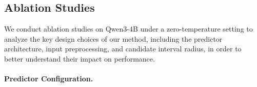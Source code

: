 \documentclass{article}
\begin{document}







\subsection{Ablation Studies}
We conduct ablation studies on Qwen3-4B under a zero-temperature setting to analyze the key design choices of our method, including the predictor architecture, input preprocessing, and candidate interval radius, in order to better understand their impact on performance.




\paragraph{Predictor Configuration.}
\end{document}
